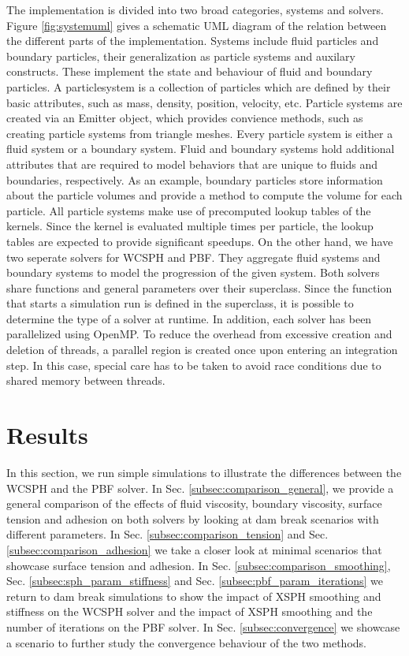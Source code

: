 \documentclass[11pt, letterpaper, twocolumn]{article}
\begin{document}
The implementation is divided into two broad categories, systems and solvers. Figure \ref{fig:systemuml} gives a schematic UML diagram of the relation between the different parts of the implementation.
Systems include fluid particles and boundary particles, their generalization as particle systems and auxilary constructs. These implement the state and behaviour of fluid and boundary particles. A particlesystem is a collection of particles which are defined by their basic attributes, such as mass, density, position, velocity, etc. Particle systems are created via an Emitter object, which provides convience methods, such as creating particle systems from triangle meshes.
Every particle system is either a fluid system or a boundary system. Fluid and boundary systems hold additional attributes that are required to model behaviors that are unique to fluids and boundaries, respectively. As an example, boundary particles store information about the particle volumes and provide a method to compute the volume for each particle. All particle systems make use of precomputed lookup tables of the kernels. Since the kernel is evaluated multiple times per particle, the lookup tables are expected to provide significant speedups. On the other hand, we have two seperate solvers for WCSPH and PBF. They aggregate fluid systems and boundary systems to model the progression of the given system. Both solvers share functions and general parameters over their superclass. Since the function that starts a simulation run is defined in the superclass, it is possible to determine the type of a solver at runtime.
In addition, each solver has been parallelized using OpenMP. To reduce the overhead from excessive creation and deletion of threads, a parallel region is created once upon entering an integration step. In this case, special care has to be taken to avoid race conditions due to shared memory between threads.

\section{Results}
\label{sec:results}
In this section, we run simple simulations to illustrate the differences between the WCSPH and the PBF solver. In Sec. \ref{subsec:comparison_general}, we provide a general comparison of the effects of fluid viscosity, boundary viscosity, surface tension and adhesion on both solvers by looking at dam break scenarios with different parameters. In Sec. \ref{subsec:comparison_tension} and Sec. \ref{subsec:comparison_adhesion} we take a closer look at minimal scenarios that showcase surface tension and 
adhesion. In Sec. \ref{subsec:comparison_smoothing}, Sec. \ref{subsec:sph_param_stiffness} and Sec. \ref{subsec:pbf_param_iterations} we return to dam break simulations to show the impact of XSPH smoothing and stiffness on the WCSPH solver and the impact of XSPH smoothing and the number of iterations on the PBF solver.
In Sec. \ref{subsec:convergence} we showcase a scenario to further study the convergence behaviour of the two methods.
\end{document}
